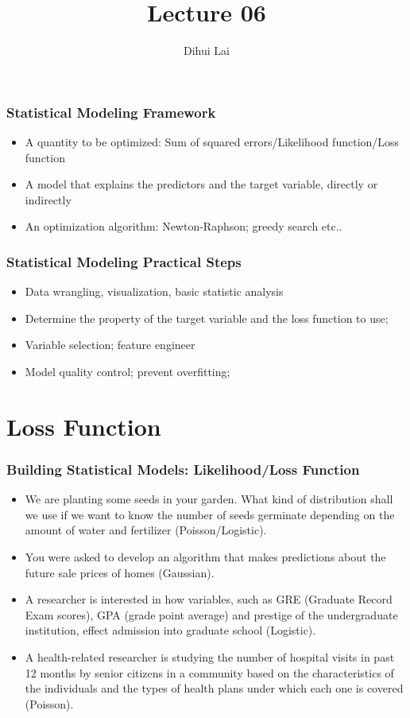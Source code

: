\documentclass[notheorems, aspectratio=54]{beamer}
\title{Lecture 06}
\author{Dihui Lai}
\institute[WUSTL]{dlai@wustl.edu}
\begin{document}
\begin{frame}
    \titlepage
\end{frame}


\begin{frame}
\frametitle{Statistical Modeling Framework}
\begin{itemize}
\item A quantity to be optimized: Sum of squared errors/Likelihood function/Loss function
\item A model that explains the predictors and the target variable, directly or indirectly
\item An optimization algorithm: Newton-Raphson; greedy search etc..
\end{itemize}
\end{frame}

\begin{frame}
\frametitle{Statistical Modeling Practical Steps}
\begin{itemize}
\item Data wrangling, visualization, basic statistic analysis
\item Determine the property of the target variable and the loss function to use;
\item Variable selection; feature engineer
\item Model quality control; prevent overfitting; 
\end{itemize}
\end{frame}


\section{Loss Function}

\begin{frame}
\frametitle{Building Statistical Models: Likelihood/Loss Function}
\begin{itemize}
\item We are planting some seeds in your garden. What kind of distribution shall we use if we want to know the number of seeds germinate depending on the amount of water and fertilizer (Poisson/Logistic).
\item You were asked to develop an algorithm that makes predictions about the future sale prices of homes (Gaussian).
\item A researcher is interested in how variables, such as GRE (Graduate Record Exam scores), GPA (grade point average) and prestige of the undergraduate institution, effect admission into graduate school (Logistic).
\item A health-related researcher is studying the number of hospital visits in past 12 months by senior citizens in a community based on the characteristics of the individuals and the types of health plans under which each one is covered (Poisson).
\end{itemize}

\end{frame}
\end{document}
